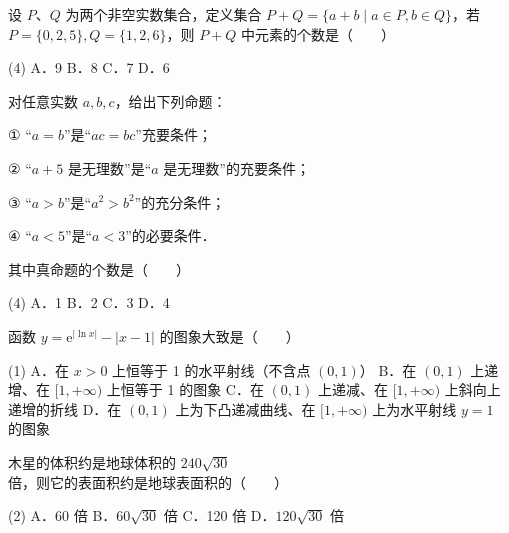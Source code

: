 

\begin{question}
设 $P$、$Q$ 为两个非空实数集合，定义集合 $P + Q = \{a + b \mid a \in P, b \in Q\}$，若 $P = \{0, 2, 5\}, Q = \{1, 2, 6\}$，则 $P + Q$ 中元素的个数是\mbox{（　　）}

\begin{gkopts}(4)
\task A．9
\task B．8
\task C．7
\task D．6
\end{gkopts}

\end{question}
\begin{question}
对任意实数 $a, b, c$，给出下列命题：

① “$a = b$”是“$ac = bc$”充要条件；

② “$a + 5$ 是无理数”是“$a$ 是无理数”的充要条件；

③ “$a > b$”是“$a^2 > b^2$”的充分条件；

④ “$a < 5$”是“$a < 3$”的必要条件．

其中真命题的个数是\mbox{（　　）}

\begin{gkopts}(4)
\task A．1
\task B．2
\task C．3
\task D．4
\end{gkopts}

\Needspace{0.4\textheight}
\end{question}
\begin{question}
函数 $y = \mathrm{e}^{|\ln x|} - |x - 1|$ 的图象大致是\mbox{（　　）}
\nopagebreak[4]
\begin{center}\end{center}
\nopagebreak[4]
\begin{gkopts}(1)
\task A．在 $x > 0$ 上恒等于 1 的水平射线（不含点 $(0, 1)$）
\task B．在 $(0, 1)$ 上递增、在 $[1, +\infty)$ 上恒等于 1 的图象
\task C．在 $(0, 1)$ 上递减、在 $[1, +\infty)$ 上斜向上递增的折线
\task D．在 $(0, 1)$ 上为下凸递减曲线、在 $[1, +\infty)$ 上为水平射线 $y = 1$ 的图象
\end{gkopts}

\end{question}
\begin{question}
木星的体积约是地球体积的 $240\sqrt{30}$ 倍，则它的表面积约是地球表面积的\mbox{（　　）}

\begin{gkopts}(2)
\task A．60 倍
\task B．$60\sqrt{30}$ 倍
\task C．120 倍
\task D．$120\sqrt{30}$ 倍
\end{gkopts}

\end{question}
